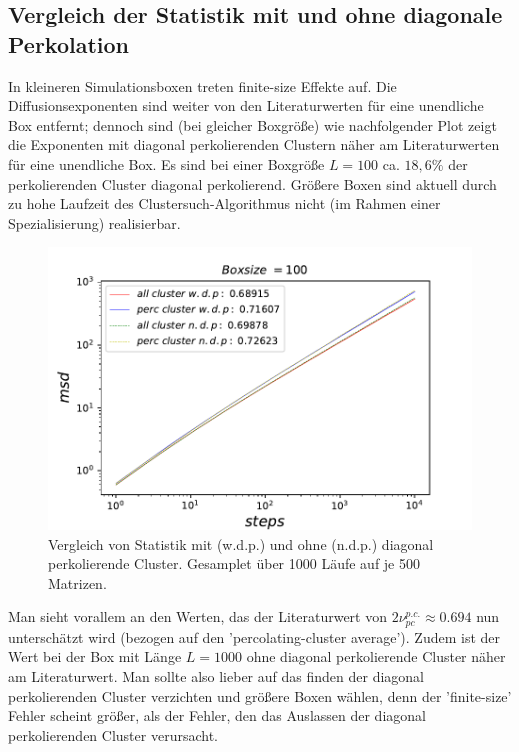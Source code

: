 \documentclass[a4paper, 12pt]{scrartcl}
\begin{document}
\subsection{Vergleich der Statistik mit und ohne diagonale Perkolation}
\noindent In kleineren Simulationsboxen treten finite-size Effekte auf. Die Diffusionsexponenten sind weiter von den Literaturwerten für eine unendliche Box entfernt; dennoch sind (bei gleicher Boxgröße) wie nachfolgender Plot zeigt die Exponenten mit diagonal perkolierenden Clustern näher am Literaturwerten für eine unendliche Box. Es sind bei einer Boxgröße $L=100$ ca. $18,6\%$ der perkolierenden Cluster diagonal perkolierend. Größere Boxen sind aktuell durch zu hohe Laufzeit des Clustersuch-Algorithmus nicht (im Rahmen einer Spezialisierung) realisierbar.
\begin{figure}[h!]
	\centering
	\includegraphics[scale=0.9]{both100.pdf}
	\caption{Vergleich von Statistik mit (w.d.p.) und ohne (n.d.p.) diagonal perkolierende Cluster. Gesamplet über 1000 Läufe auf je 500 Matrizen.}
\end{figure}

\noindent Man sieht vorallem an den Werten, das der Literaturwert von $2\nu_{pc}^{p.c.} \approx 0.694$ nun unterschätzt wird (bezogen auf den 'percolating-cluster average'). Zudem ist der Wert bei der Box mit Länge $L=1000$ ohne diagonal perkolierende Cluster näher am Literaturwert. Man sollte also lieber auf das finden der diagonal perkolierenden Cluster verzichten und größere Boxen wählen, denn der 'finite-size' Fehler scheint größer, als der Fehler, den das Auslassen der diagonal perkolierenden Cluster verursacht.
\end{document}
